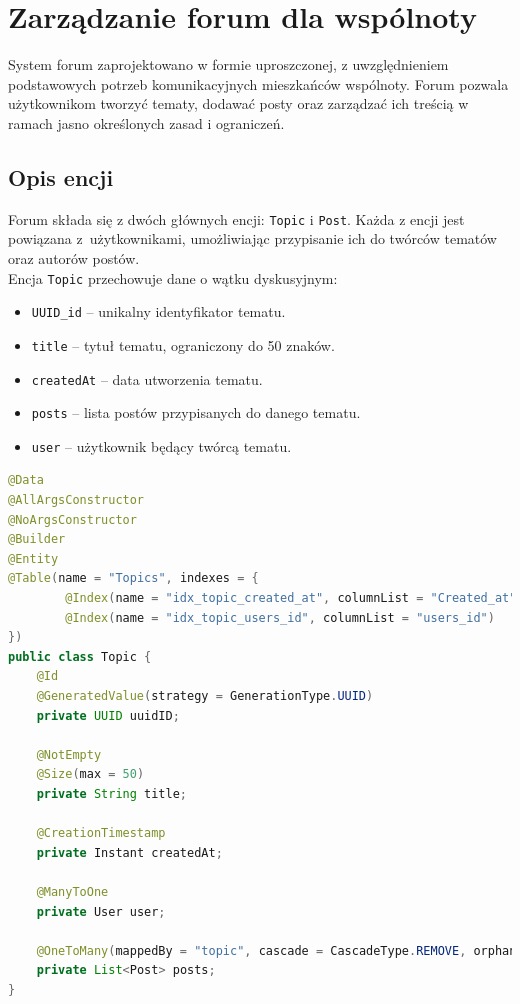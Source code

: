 \section{Zarządzanie forum dla wspólnoty}

System forum zaprojektowano w formie uproszczonej, z uwzględnieniem podstawowych potrzeb komunikacyjnych mieszkańców wspólnoty. Forum pozwala użytkownikom tworzyć tematy, dodawać posty oraz zarządzać ich treścią w ramach jasno określonych zasad i ograniczeń.

\subsection{Opis encji}

Forum składa się z dwóch głównych encji: \texttt{Topic} i \texttt{Post}.
Każda z encji jest powiązana z~użytkownikami, umożliwiając przypisanie ich do twórców tematów oraz autorów postów.\\[-10pt]

\noindent Encja \texttt{Topic} przechowuje dane o wątku dyskusyjnym:
\begin{itemize}
    \item \texttt{UUID\_id} -- unikalny identyfikator tematu.
    \item \texttt{title} -- tytuł tematu, ograniczony do 50 znaków.
    \item \texttt{createdAt} -- data utworzenia tematu.
    \item \texttt{posts} -- lista postów przypisanych do danego tematu.
    \item \texttt{user} -- użytkownik będący twórcą tematu.
\end{itemize}

\begin{lstlisting}[language=Java, style=JavaStyle, caption=Encja \texttt{Topic}]
@Data
@AllArgsConstructor
@NoArgsConstructor
@Builder
@Entity
@Table(name = "Topics", indexes = {
        @Index(name = "idx_topic_created_at", columnList = "Created_at"),
        @Index(name = "idx_topic_users_id", columnList = "users_id")
})
public class Topic {
    @Id
    @GeneratedValue(strategy = GenerationType.UUID)
    private UUID uuidID;

    @NotEmpty
    @Size(max = 50)
    private String title;

    @CreationTimestamp
    private Instant createdAt;

    @ManyToOne
    private User user;

    @OneToMany(mappedBy = "topic", cascade = CascadeType.REMOVE, orphanRemoval = true)
    private List<Post> posts;
}
\end{lstlisting}


